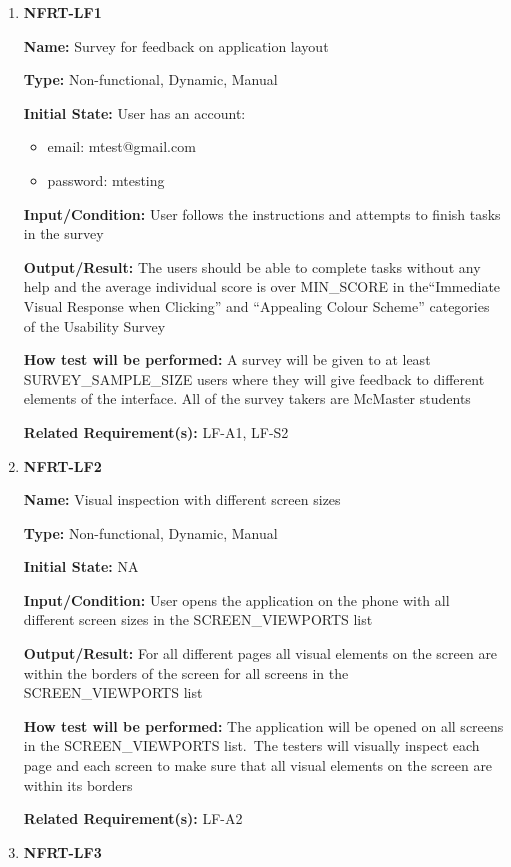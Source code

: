 \documentclass[12pt, titlepage]{article}
\begin{document}
\begin{enumerate}
\item{\textbf{NFRT-LF1}}

\textbf{Name:} Survey for feedback on application layout

\textbf{Type:} Non-functional, Dynamic, Manual
					
\textbf{Initial State:} User has an account:
\begin{itemize}
\item email: mtest@gmail.com
\item password: mtesting
\end{itemize}

\textbf{Input/Condition:} User follows the instructions and attempts to finish tasks in the survey 
					
\textbf{Output/Result:} The users should be able to complete tasks without any help and the average individual score is over MIN\_SCORE in the``Immediate Visual Response when Clicking'' and ``Appealing Colour Scheme'' categories of the Usability Survey
					
\textbf{How test will be performed:} A survey will be given to at least
SURVEY\_SAMPLE\_SIZE users where they will give feedback to different elements of the interface. All of the survey takers are McMaster students

\textbf{Related Requirement(s):} LF-A1, LF-S2

\item{\textbf{NFRT-LF2}}

\textbf{Name:} Visual inspection with different screen sizes

\textbf{Type:} Non-functional, Dynamic, Manual
					
\textbf{Initial State:} NA
					
\textbf{Input/Condition:} User opens the application on the phone with all different screen sizes in the SCREEN\_VIEWPORTS list

\textbf{Output/Result:} For all different pages all visual elements on the screen are within the borders of the screen for all screens in the SCREEN\_VIEWPORTS list

\textbf{How test will be performed:} The application will be opened on all screens in the SCREEN\_VIEWPORTS list.\
The testers will visually inspect each page and each screen to make sure that all visual elements on the screen are within its borders

\textbf{Related Requirement(s):} LF-A2

\item{\textbf{NFRT-LF3}}


\end{enumerate}
\end{document}
